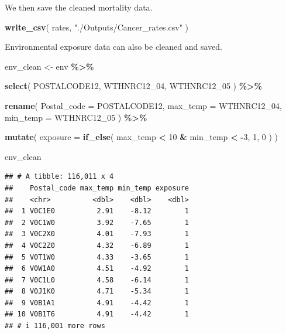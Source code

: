 \documentclass[
  11pt,
  oneside]{book}
\newenvironment{Shaded}{\begin{snugshade}}{\end{snugshade}}
\newcommand{\AttributeTok}[1]{\textcolor[rgb]{0.13,0.29,0.53}{#1}}
\newcommand{\DecValTok}[1]{\textcolor[rgb]{0.00,0.00,0.81}{#1}}
\newcommand{\FunctionTok}[1]{\textcolor[rgb]{0.13,0.29,0.53}{\textbf{#1}}}
\newcommand{\NormalTok}[1]{#1}
\newcommand{\OtherTok}[1]{\textcolor[rgb]{0.56,0.35,0.01}{#1}}
\newcommand{\SpecialCharTok}[1]{\textcolor[rgb]{0.81,0.36,0.00}{\textbf{#1}}}
\newcommand{\StringTok}[1]{\textcolor[rgb]{0.31,0.60,0.02}{#1}}
\begin{document}
We then save the cleaned mortality data.

\begin{Shaded}
\begin{Highlighting}[]
\FunctionTok{write\_csv}\NormalTok{(}
\NormalTok{  rates,}
  \StringTok{"./Outputs/Cancer\_rates.csv"}
\NormalTok{)}
\end{Highlighting}
\end{Shaded}

Environmental exposure data can also be cleaned and saved.

\begin{Shaded}
\begin{Highlighting}[]
\NormalTok{env\_clean }\OtherTok{\textless{}{-}}\NormalTok{ env }\SpecialCharTok{\%\textgreater{}\%}
  
  \FunctionTok{select}\NormalTok{(}
\NormalTok{    POSTALCODE12,}
\NormalTok{    WTHNRC12\_04,}
\NormalTok{    WTHNRC12\_05}
\NormalTok{  ) }\SpecialCharTok{\%\textgreater{}\%}
  
  \FunctionTok{rename}\NormalTok{(}
    \AttributeTok{Postal\_code =}\NormalTok{ POSTALCODE12,}
    \AttributeTok{max\_temp =}\NormalTok{ WTHNRC12\_04,}
    \AttributeTok{min\_temp =}\NormalTok{ WTHNRC12\_05}
\NormalTok{  ) }\SpecialCharTok{\%\textgreater{}\%}
  
  \FunctionTok{mutate}\NormalTok{(}
    \AttributeTok{exposure =} \FunctionTok{if\_else}\NormalTok{(}
\NormalTok{      max\_temp }\SpecialCharTok{\textless{}} \DecValTok{10} \SpecialCharTok{\&}
\NormalTok{      min\_temp }\SpecialCharTok{\textless{}} \SpecialCharTok{{-}}\DecValTok{3}\NormalTok{,}
      \DecValTok{1}\NormalTok{,}
      \DecValTok{0}
\NormalTok{    )}
\NormalTok{  )}

\NormalTok{env\_clean}
\end{Highlighting}
\end{Shaded}

\begin{verbatim}
## # A tibble: 116,011 x 4
##    Postal_code max_temp min_temp exposure
##    <chr>          <dbl>    <dbl>    <dbl>
##  1 V0C1E0          2.91    -8.12        1
##  2 V0C1W0          3.92    -7.65        1
##  3 V0C2X0          4.01    -7.93        1
##  4 V0C2Z0          4.32    -6.89        1
##  5 V0T1W0          4.33    -3.65        1
##  6 V0W1A0          4.51    -4.92        1
##  7 V0C1L0          4.58    -6.14        1
##  8 V0J1K0          4.71    -5.34        1
##  9 V0B1A1          4.91    -4.42        1
## 10 V0B1T6          4.91    -4.42        1
## # i 116,001 more rows
\end{verbatim}
\end{document}
